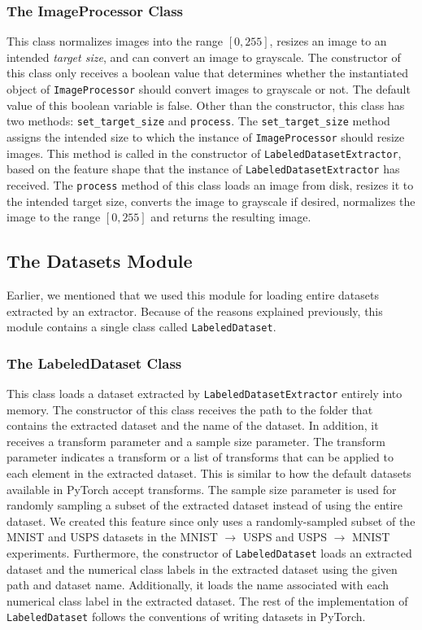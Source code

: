 \documentclass[14pt]{extarticle}
\begin{document}
		\subsubsection{The ImageProcessor Class}
		This class normalizes images into the range $[0, 255]$, resizes an image to an intended \textit{target size}, and can convert an image to grayscale. The constructor of this class only receives a boolean value that determines whether the instantiated object of \texttt{ImageProcessor} should convert images to grayscale or not. The default value of this boolean variable is false. Other than the constructor, this class has two methods: \texttt{set\_target\_size} and \texttt{process}. The \texttt{set\_target\_size} method assigns the intended size to which the instance of \texttt{ImageProcessor} should resize images. This method is called in the constructor of \texttt{LabeledDatasetExtractor}, based on the feature shape that the instance of \texttt{LabeledDatasetExtractor} has received. The \texttt{process} method of this class loads an image from disk, resizes it to the intended target size, converts the image to grayscale if desired, normalizes the image to the range $[0, 255]$ and returns the resulting image.
		\subsection{The Datasets Module}
		Earlier, we mentioned that we used this module for loading entire datasets extracted by an extractor. Because of the reasons explained previously, this module contains a single class called \texttt{LabeledDataset}.
		\subsubsection{The LabeledDataset Class}
		This class loads a dataset extracted by \texttt{LabeledDatasetExtractor} entirely into memory. The constructor of this class receives the path to the folder that contains the extracted dataset and the name of the dataset. In addition, it receives a transform parameter and a sample size parameter. The transform parameter indicates a transform or a list of transforms that can be applied to each element in the extracted dataset. This is similar to how the default datasets available in PyTorch accept transforms. The sample size parameter is used for randomly sampling a subset of the extracted dataset instead of using the entire dataset. We created this feature since \cite{adda} only uses a randomly-sampled subset of the MNIST \cite{mnist} and USPS \cite{usps} datasets in the MNIST $\rightarrow$ USPS and USPS $\rightarrow$ MNIST experiments. Furthermore, the constructor of \texttt{LabeledDataset} loads an extracted dataset and the numerical class labels in the extracted dataset using the given path and dataset name. Additionally, it loads the name associated with each numerical class label in the extracted dataset. The rest of the implementation of \texttt{LabeledDataset} follows the conventions of writing datasets in PyTorch.
\end{document}

